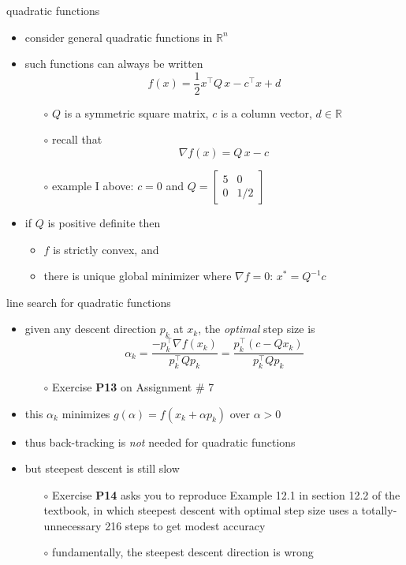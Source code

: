 \documentclass[10pt,hyperref]{beamer}
\newcommand{\grad}{\nabla}
\newcommand{\RR}{\mathbb{R}}
\begin{document}
\begin{frame}{quadratic functions}

\begin{itemize}
\item consider general quadratic functions in $\RR^n$
\item such functions can always be written
    $$f(x) = \frac{1}{2} x^\top Q\, x - c^\top x + d$$
    \begin{itemize}
    \vspace{-3mm}
    \item[$\circ$] $Q$ is a symmetric square matrix, $c$ is a column vector, $d\in \RR$
    \item[$\circ$] recall that
        $$\grad f(x) = Q\, x - c$$
    \item[$\circ$] example I above: $c=0$ and $\displaystyle Q = \begin{bmatrix} 5 & 0 \\ 0 & 1/2 \end{bmatrix}$
    \end{itemize}
\item if $Q$ is positive definite then
            \begin{itemize}
            \item $f$ is strictly convex, and
            \item there is unique global minimizer where $\grad f=0$: \qquad $x^* = Q^{-1} c$
            \end{itemize}
\end{itemize}
\end{frame}


\begin{frame}{line search for quadratic functions}

\begin{itemize}
\item given any descent direction $p_k$ at $x_k$, the \emph{optimal} step size is
    $$\alpha_k = \frac{-p_k^\top \grad f(x_k)}{p_k^\top Q p_k} = \frac{p_k^\top (c - Q x_k)}{p_k^\top Q p_k}$$
    \begin{itemize}
    \item[$\circ$] Exercise \textbf{P13} on Assignment \# 7
    \end{itemize}
\item this $\alpha_k$ minimizes $g(\alpha) = f(x_k + \alpha p_k)$ over $\alpha>0$
\item thus back-tracking is \emph{not} needed for quadratic functions

\bigskip
\item \alert{but} steepest descent is still slow
    \begin{itemize}
    \item[$\circ$] Exercise \textbf{P14} asks you to reproduce Example 12.1 in section 12.2 of the textbook, in which steepest descent with optimal step size uses a totally-unnecessary 216 steps to get modest accuracy
    \item[$\circ$] fundamentally, \alert{the steepest descent direction is wrong}
    \end{itemize}

\end{itemize}
\end{frame}
\end{document}
